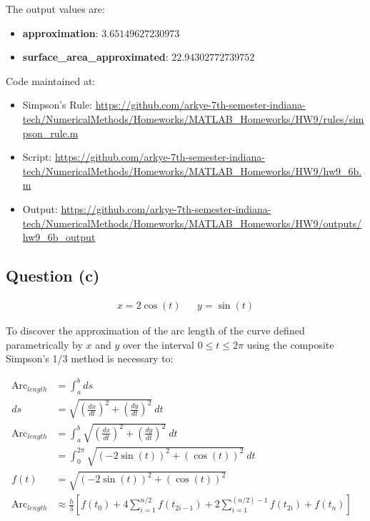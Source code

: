 		The output values are:
		\begin{itemize}
			\item{\textbf{approximation}: $3.65149627230973$}
			\item{\textbf{surface\_area\_approximated}: $22.94302772739752$}
		\end{itemize}

		Code maintained at:
		\begin{itemize}
			\item{Simpson's Rule: \url{https://github.com/arkye-7th-semester-indiana-tech/NumericalMethods/Homeworks/MATLAB_Homeworks/HW9/rules/simpson_rule.m}}
			\item{Script: \url{https://github.com/arkye-7th-semester-indiana-tech/NumericalMethods/Homeworks/MATLAB_Homeworks/HW9/hw9_6b.m}}
			\item{Output: \url{https://github.com/arkye-7th-semester-indiana-tech/NumericalMethods/Homeworks/MATLAB_Homeworks/HW9/outputs/hw9_6b_output}}
		\end{itemize}

	\subsection{Question (c)}
		\begin{align}
			&x = 2\cos(t)&
			&y = \sin(t)&
		\end{align}

		To discover the approximation of the arc length of the curve defined parametrically by $x$ and $y$ over the interval $0 \leq t \leq 2 \pi$ using the composite Simpson's 1/3 method is necessary to:

		\begin{align}
			\text{Arc}_{length} &= \int_{a}^{b} ds& \\
			ds &= \sqrt{\left(\frac{dx}{dt}\right)^{2} + \left(\frac{dy}{dt}\right)^{2}} \ dt& \\
			\text{Arc}_{length} &= \int_{a}^{b} \sqrt{\left(\frac{dx}{dt}\right)^{2} + \left(\frac{dy}{dt}\right)^{2}} \ dt \\
			&= \int_{0}^{2\pi} \sqrt{(-2\sin(t))^{2} + (\cos(t))^{2}} \ dt \\
			f(t) &= \sqrt{(-2\sin(t))^{2} + (\cos(t))^{2}}& \\
			\text{Arc}_{length} &\approx \frac{h}{3}\left[
			f(t_{0})+
			4 \sum_{i=1}^{n/2} f(t_{2i-1}) +
			2 \sum_{i=1}^{(n/2)-1} f(t_{2i}) +
			f(t_{n})
			\right]&
		\end{align}

